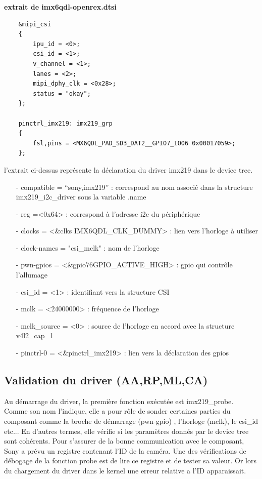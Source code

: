 {\textbf{extrait de imx6qdl-openrex.dtsi}

\begin{lstlisting}
    &mipi_csi 
    {
        ipu_id = <0>;
        csi_id = <1>;
        v_channel = <1>;
        lanes = <2>;
        mipi_dphy_clk = <0x28>;
        status = "okay";
    };

    pinctrl_imx219: imx219_grp
    {
        fsl,pins = <MX6QDL_PAD_SD3_DAT2__GPIO7_IO06 0x00017059>;
    };
\end{lstlisting}

l’extrait ci-dessus représente la déclaration du driver imx219 dans le
device tree.

\begin{itemize}
    \item[-]compatible = “sony,imx219” : correspond au nom associé
    dans la structure imx219\_i2c\_driver sous la variable .name
    \item[-]reg =<0x64> : correspond à l’adresse i2c du périphérique
    \item[-] clocks = <\&clks IMX6QDL\_CLK\_DUMMY> : lien vers l'horloge à utiliser
    \item[-] clock-names = "csi\_mclk" : nom de l’horloge
    \item[-] pwn-gpios = <\&gpio76GPIO\_ACTIVE\_HIGH> : gpio qui contrôle l’allumage
    \item[-] csi\_id = <1> : identifiant vers la structure CSI
    \item[-] mclk = <24000000> : fréquence de l’horloge
    \item[-] mclk\_source = <0> : source de l’horloge en accord avec la structure v4l2\_cap\_1
    \item[-] pinctrl-0 = <\&pinctrl\_imx219> : lien vers la déclaration des gpios
\end{itemize}

\subsection{Validation du driver (AA,RP,ML,CA)}

Au démarrage du driver, la première fonction exécutée est imx219\_probe. 
Comme son nom l’indique, elle a pour rôle de sonder certaines parties du composant comme la broche
de démarrage (pwn-gpio) , l’horloge (mclk), le csi\_id etc... En d’autres termes, elle vérifie
si les paramètres donnés par le device tree sont cohérents. Pour s’assurer de la bonne
communication avec le composant, Sony a prévu un registre contenant l’ID de la caméra.
Une des vérifications de débogage de la fonction probe est de lire ce registre et de tester
sa valeur. Or lors du chargement du driver dans le kernel une erreur relative a l’ID
apparaissait. \medskip 

}
